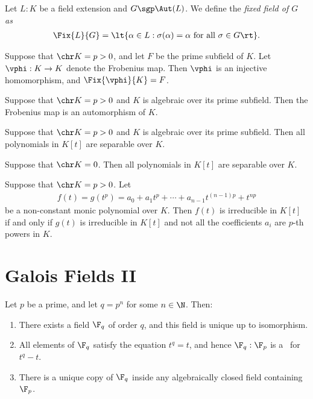 \documentclass{article}
\begin{document}
\begin{tdefinition}
  Let \( L:K \) be a field extension and \( G \sgp \Aut(L) \).
  We define the \it{fixed field of \( G \)} as \begin{align*}
    \Fix{L}{G} = \lt\{ \alpha\in L : \sigma(\alpha) = \alpha \text{ for all } \sigma\in G \rt\}.
  \end{align*}
\end{tdefinition}

\begin{ttheorem}
  Suppose that \( \chr K = p>0 \), and let \( F \) be the prime subfield of \( K \).
  Let \( \vphi:K\to K \) denote the Frobenius map.
  Then \( \vphi \) is an injective homomorphism, and \( \Fix{\vphi}{K} = F \).
\end{ttheorem}

\begin{tcorollary}
  Suppose that \( \chr K = p > 0 \) and \( K \) is algebraic over its prime subfield.
  Then the Frobenius map is an automorphism of \( K \).
\end{tcorollary}

\begin{tcorollary}
  Suppose that \( \chr K = p > 0 \) and \( K \) is algebraic over its prime subfield.
  Then all polynomials in \( K[t] \) are separable over \( K \).
\end{tcorollary}

\begin{tcorollary}[**]
  Suppose that \( \chr K = 0 \).
  Then all polynomials in \( K[t] \) are separable over \( K \).
\end{tcorollary}

\begin{ttheorem}
  Suppose that \( \chr K = p > 0 \). Let \begin{align*}
    f(t) = g(t^p) = a_0+a_1t^p+\cdots+a_{n-1}t^{(n-1)p}+t^{np}
  \end{align*}
  be a non-constant monic polynomial over \( K \).
  Then \( f(t) \) is irreducible in \( K[t] \) if and only if \( g(t) \) is irreducible in \( K[t] \) and not all the coefficients \( a_i \) are \( p \)-th powers in \( K \).
\end{ttheorem}

\section{Galois Fields II}

\begin{ttheorem}
  Let \( p \) be a prime, and let \( q=p^n \) for some \( n\in \N \).
  Then: \begin{enumerate}[label=(\alph*)]
    \item There exists a field \( \F_q \) of order \( q \), and this field is unique up to isomorphism.
    \item All elements of \( \F_q \) satisfy the equation \( t^q=t \), and hence \( \F_q:\F_p \) is a \sfe~for \( t^q-t \).
    \item There is a unique copy of \( \F_q \) inside any algebraically closed field containing \( \F_p \).
  \end{enumerate}
\end{ttheorem}
\end{document}
